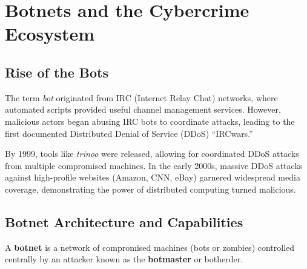 \section{Botnets and the Cybercrime Ecosystem}

\subsection{Rise of the Bots}
The term \textit{bot} originated from IRC (Internet Relay Chat) networks, where automated scripts provided useful channel management services. However, malicious actors began abusing IRC bots to coordinate attacks, leading to the first documented Distributed Denial of Service (DDoS) ``IRCwars.''

By 1999, tools like \textit{trinoo} were released, allowing for coordinated DDoS attacks from multiple compromised machines. In the early 2000s, massive DDoS attacks against high-profile websites (Amazon, CNN, eBay) garnered widespread media coverage, demonstrating the power of distributed computing turned malicious.

\subsection{Botnet Architecture and Capabilities}
A \textbf{botnet} is a network of compromised machines (bots or zombies) controlled centrally by an attacker known as the \textbf{botmaster} or botherder.

